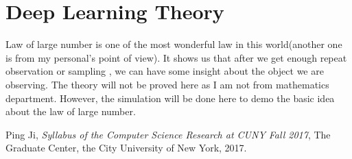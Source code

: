 \documentclass[a4paper,12pt]{article}
\begin{document}
\section{Deep Learning Theory}
Law of large number is one of the most wonderful law in this world(another one is  from my personal's point of view). It shows us that after we get enough repeat observation or sampling , we can have some insight about the object we are observing. The theory will not be proved here as I am not from mathematics department. However, the simulation will be done here to demo the basic idea about the law of large number.\\

 \begin{thebibliography}{56}

  Ping Ji,
  \textit{Syllabus of the Computer Science Research at CUNY Fall 2017},
  The Graduate Center, the City University of New York,
  2017.



\end{thebibliography}
  
 
\end{document}
